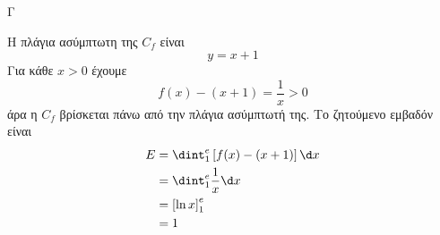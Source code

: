 \begin{thema}{Γ}
\begin{erwthma}
\item Η πλάγια ασύμπτωτη της $C_f$ είναι
\[y=x+1\]
Για κάθε $x>0$ έχουμε
\[f(x)-(x+1)=\frac{1}{x}>0\]
άρα η $C_f$ βρίσκεται πάνω από την πλάγια ασύμπτωτή της.
Το ζητούμενο εμβαδόν είναι
\begin{align*}
E&=\dint_1^e\left[f(x)-(x+1)\right]\d x\\
&=\dint_1^e \frac{1}{x}\d x\\
&=\left[\ln x\right]_1^e\\
&=1
\end{align*}
\end{erwthma}
\end{thema}
